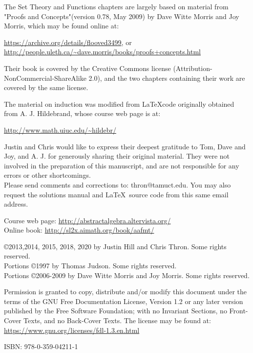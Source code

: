 \documentclass[11pt]{book}
\numberwithin{equation}{section}
\begin{document}
The Set Theory and Functions chapters are largely based on material from  "Proofs and Concepts"(version 0.78, May 2009) by Dave Witte Morris and Joy Morris, which may be found online at:
\begin{center}
\url{https://archive.org/details/flooved3499}, or \\
\url{http://people.uleth.ca/~dave.morris/books/proofs+concepts.html}
\end{center}
Their book is covered by the Creative Commons license (Attribution-NonCommercial-ShareAlike 2.0), and the two chapters containing their work are covered by the same license.

The material on induction was modified from \LaTeX code originally obtained from A. J. Hildebrand, whose course web page is at:
\begin{center}
\url{http://www.math.uiuc.edu/~hildebr/}
\end{center}
\noindent
Justin and  Chris would like to express their deepest gratitude to Tom, Dave and Joy, and  A. J.  for generously sharing their original material. They were not involved in the preparation of this manuscript, and are not responsible for any errors or other shortcomings.\\[0.3cm]
Please send comments and corrections to: thron@tamuct.edu. You may also request the solutions manual and  \LaTeX~source code  from this same email address.
\begin{center}
Course web page: \url{http://abstractalgebra.altervista.org/}\\
Online book: \url{http://sl2x.aimath.org/book/aafmt/}
\end{center}

\vfill
\copyright 2013,2014, 2015, 2018, 2020 by Justin Hill and Chris Thron. Some rights reserved.\\
Portions \copyright 1997 by Thomas Judson. Some rights reserved.\\
Portions \copyright 2006-2009 by Dave Witte Morris and Joy Morris. Some rights reserved.

Permission is granted to copy, distribute and/or modify this document under the terms of the GNU Free Documentation License, Version 1.2 or any later version published by the Free Software Foundation; with no Invariant Sections, no Front-Cover Texts, and no Back-Cover Texts. The license may be found at: \url{https://www.gnu.org/licenses/fdl-1.3.en.html}

\begin{center}
ISBN:  978-0-359-04211-1
\end{center}
\end{document}

